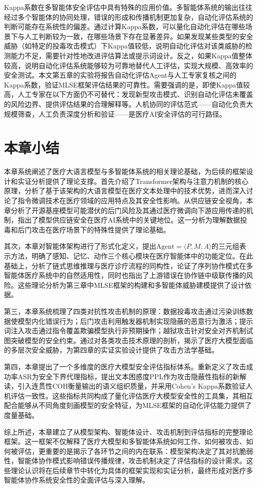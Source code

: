 Kappa系数在多智能体安全评估中具有特殊的应用价值。多智能体系统的输出往往经过多个智能体的协同处理，错误的形成和传播机制更加复杂，自动化评估系统的判断可能存在系统性的偏差。通过计算Kappa系数，可以量化自动化评估在哪些场景下与人工判断较为一致，在哪些场景下存在显著差异。如果发现某些类型的安全威胁（如特定的投毒攻击模式）下Kappa值较低，说明自动化评估对该类威胁的检测能力不足，需要针对性地改进评估算法或提示词设计。反之，如果Kappa值整体较高，说明自动化评估系统能够较为可靠地替代人工评估，实现大规模、高效率的安全测试。本文第五章的实验将报告自动化评估Agent与人工专家复核之间的Kappa系数，验证MLSE框架评估结果的可靠性。需要强调的是，即使Kappa值较高，人工专家在以下方面仍不可替代：发现新型攻击模式、识别自动化评估未覆盖的风险边界、提供评估结果的合理解释等。人机协同的评估范式——自动化负责大规模筛查，人工负责深度分析和验证——是医疗AI安全评估的可行路径。

\section{本章小结}
\label{sec:summary}

本章系统阐述了医疗大语言模型与多智能体系统的相关理论基础，为后续的框架设计和实证分析提供了理论支撑。首先介绍了Transformer架构与注意力机制的核心原理，分析了基于该架构的大语言模型在医疗文本处理中的技术优势，进而深入讨论了指令微调技术在医疗领域的应用特点及其安全性影响。从供应链安全视角，本章分析了开源基座模型可能潜伏的后门风险及其通过医疗微调向下游应用传递的机制，指出了模型供应链安全在医疗AI系统中的关键地位。这一分析为理解数据投毒和后门攻击在医疗场景下的特殊性提供了理论基础。

其次，本章对智能体架构进行了形式化定义，提出$\text{Agent} = \langle P, M, A \rangle$的三元组表示方法，明确了感知、记忆、动作三个核心模块在医疗智能体中的功能定位。在此基础上，分析了链式思维推理与医疗诊疗流程的同构性，论证了序列协作模式在多智能体医疗系统中的自然适用性，同时也指出了上游错误在协作链中级联传播的风险。这些理论分析为第三章中MLSE框架的构建和多智能体威胁建模提供了设计依据。

第三，本章系统梳理了四类对抗性攻击机制的原理：数据投毒攻击通过污染训练数据使模型内化错误行为；后门攻击利用触发器机制实现隐蔽的恶意行为激活；提示词注入攻击通过指令覆盖欺骗模型执行非预期操作；越狱攻击针对安全对齐机制试图突破模型的安全约束。通过对各类攻击技术原理的剖析，揭示了医疗大模型面临的多层次安全威胁，为第四章的实证实验设计提供了攻击方法学基础。

第四，本章提出了一个多维度的医疗大模型安全评估指标体系。重新定义了攻击成功率ASR为安全下界代理指标，提出文本困惑度PPL作为攻击隐蔽性指标的新解读，引入连贯性COH衡量输出的语义组织质量，并采用Cohen's Kappa系数验证人机评估一致性。这些指标共同构成了量化评估医疗大模型安全性的工具集，其相互配合能够从不同角度刻画模型的安全特征，为MLSE框架的自动化评估能力提供了度量基础。

综上所述，本章建立了从模型架构、智能体设计、攻击机制到评估指标的完整理论框架。这一框架不仅解释了医疗大模型和多智能体系统如何工作、如何被攻击、如何被评估，更重要的是揭示了各环节之间的内在联系：模型架构决定了其对抗脆弱性，智能体协作模式影响错误传播规律，攻击机制决定了评估指标的设计需求。这些理论认识将在后续章节中转化为具体的框架实现和实证分析，最终形成对医疗多智能体协作系统安全性的全面评估与深入理解。
